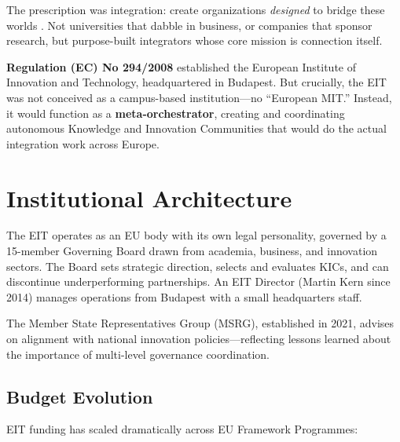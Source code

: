 \documentclass[../main.tex]{subfiles}
\begin{document}
The prescription was integration: create organizations \textit{designed} to bridge these worlds . Not universities that dabble in business, or companies that sponsor research, but purpose-built integrators whose core mission is connection itself.

\textbf{Regulation (EC) No 294/2008} established the European Institute of Innovation and Technology, headquartered in Budapest. But crucially, the EIT was not conceived as a campus-based institution---no ``European MIT.'' Instead, it would function as a \textbf{meta-orchestrator}, creating and coordinating autonomous Knowledge and Innovation Communities that would do the actual integration work across Europe.


\section*{Institutional Architecture}

The EIT operates as an EU body with its own legal personality, governed by a 15-member Governing Board drawn from academia, business, and innovation sectors. The Board sets strategic direction, selects and evaluates KICs, and can discontinue underperforming partnerships. An EIT Director (Martin Kern since 2014) manages operations from Budapest with a small headquarters staff.

The Member State Representatives Group (MSRG), established in 2021, advises on alignment with national innovation policies---reflecting lessons learned about the importance of multi-level governance coordination.

\subsection*{Budget Evolution}

EIT funding has scaled dramatically across EU Framework Programmes:
\end{document}
